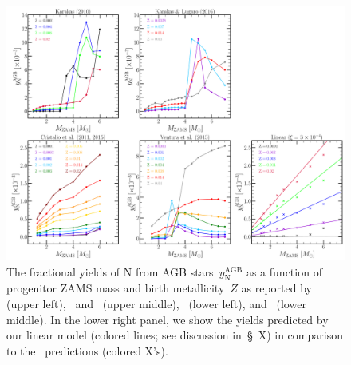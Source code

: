 \documentclass[ms.tex]{subfiles}
\begin{document}
\begin{figure} 
\centering 
\includegraphics[scale = 0.33]{agb_yield_models.pdf} 
\caption{
The fractional yields of N from AGB stars~$y_\text{N}^\text{AGB}$ as a function 
of progenitor ZAMS mass and birth metallicity~$Z$ as reported 
by~\citet{Karakas2010} (upper left),~\citet{Karakas2016} and~\citet{Karakas2018} 
(upper middle),~\citet{Cristallo2011, Cristallo2015} (lower left), 
and~\citet{Ventura2013} (lower middle). 
In the lower right panel, we show the yields predicted by our linear model 
(colored lines; see discussion in~\S~X) in comparison to 
the~\citet{Cristallo2011, Cristallo2015} predictions (colored X's). 
}
\label{fig:agb_yield_models} 
\end{figure} 
\end{document}
